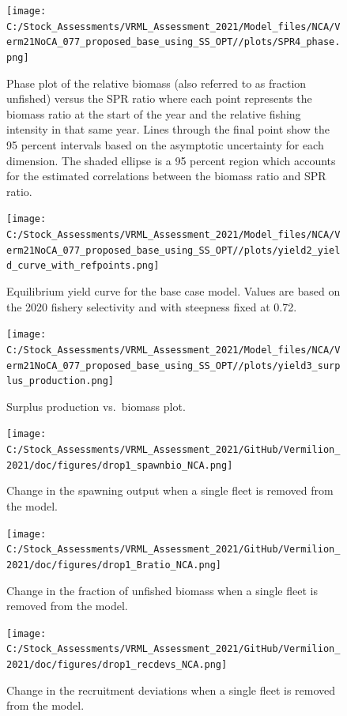 \documentclass[
  english,
  a4paper,
]{article}
\begin{document}
\begin{figure}
\centering
\texttt{[image: C:/Stock\_Assessments/VRML\_Assessment\_2021/Model\_files/NCA/Verm21NoCA\_077\_proposed\_base\_using\_SS\_OPT//plots/SPR4\_phase.png]}
\caption{Phase plot of the relative biomass (also referred to as fraction unfished) versus the SPR ratio where each point represents the biomass ratio at the start of the year and the relative fishing intensity in that same year. Lines through the final point show the 95 percent intervals based on the asymptotic uncertainty for each dimension. The shaded ellipse is a 95 percent region which accounts for the estimated correlations between the biomass ratio and SPR ratio.\label{fig:phase}}
\end{figure}

\begin{figure}
\centering
\texttt{[image: C:/Stock\_Assessments/VRML\_Assessment\_2021/Model\_files/NCA/Verm21NoCA\_077\_proposed\_base\_using\_SS\_OPT//plots/yield2\_yield\_curve\_with\_refpoints.png]}
\caption{Equilibrium yield curve for the base case model. Values are based on the 2020
fishery selectivity and with steepness fixed at 0.72.\label{fig:yield2}}
\end{figure}

\begin{figure}
\centering
\texttt{[image: C:/Stock\_Assessments/VRML\_Assessment\_2021/Model\_files/NCA/Verm21NoCA\_077\_proposed\_base\_using\_SS\_OPT//plots/yield3\_surplus\_production.png]}
\caption{Surplus production vs.~biomass plot.\label{fig:yield3}}
\end{figure}

\FloatBarrier

\begin{figure}
\centering
\texttt{[image: C:/Stock\_Assessments/VRML\_Assessment\_2021/GitHub/Vermilion\_2021/doc/figures/drop1\_spawnbio\_NCA.png]}
\caption{Change in the spawning output when a single fleet is removed from the model.\label{fig:drop-spawnbio}}
\end{figure}

\begin{figure}
\centering
\texttt{[image: C:/Stock\_Assessments/VRML\_Assessment\_2021/GitHub/Vermilion\_2021/doc/figures/drop1\_Bratio\_NCA.png]}
\caption{Change in the fraction of unfished biomass when a single fleet is removed from the model.\label{fig:drop-bratio}}
\end{figure}

\begin{figure}
\centering
\texttt{[image: C:/Stock\_Assessments/VRML\_Assessment\_2021/GitHub/Vermilion\_2021/doc/figures/drop1\_recdevs\_NCA.png]}
\caption{Change in the recruitment deviations when a single fleet is removed from the model.\label{fig:drop-recdev}}
\end{figure}
\end{document}
